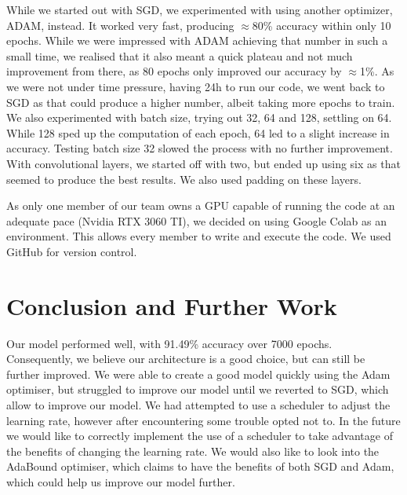 \documentclass[journal]{IEEEtran}
\begin{document}
While we started out with SGD, we experimented with using another optimizer, ADAM, instead. It worked very fast, producing $\approx$80\% accuracy within only 10 epochs. While we were impressed with ADAM achieving that number in such a small time, we realised that it also meant a quick plateau and not much improvement from there, as 80 epochs only improved our accuracy by $\approx$1\%. As we were not under time pressure, having 24h to run our code, we went back to SGD as that could produce a higher number, albeit taking more epochs to train. We also experimented with batch size, trying out 32, 64 and 128, settling on 64. While 128 sped up the computation of each epoch, 64 led to a slight increase in accuracy. Testing batch size 32 slowed the process with no further improvement. With convolutional layers, we started off with two, but ended up using six as that seemed to produce the best results. We also used padding on these layers.

As only one member of our team owns a GPU capable of running the code at an adequate pace (Nvidia RTX 3060 TI), we decided on using Google Colab as an environment. This allows every member to write and execute the code. We used GitHub for version control. 

\section{Conclusion and Further Work}
Our model performed well, with 91.49\% accuracy over 7000 epochs. Consequently, we believe our architecture is a good choice, but can still be further improved. We were able to create a good model quickly using the Adam optimiser, but struggled to improve our model until we reverted to SGD, which allow to improve our model. We had attempted to use a scheduler to adjust the learning rate, however after encountering some trouble opted not to. In the future we would like to correctly implement the use of a scheduler to take advantage of the benefits of changing the learning rate. We would also like to look into the AdaBound optimiser, which claims to have the benefits of both SGD and Adam, which could help us improve our model further.


\ifCLASSOPTIONcaptionsoff
  \newpage
\fi

\printbibliography
\end{document}
